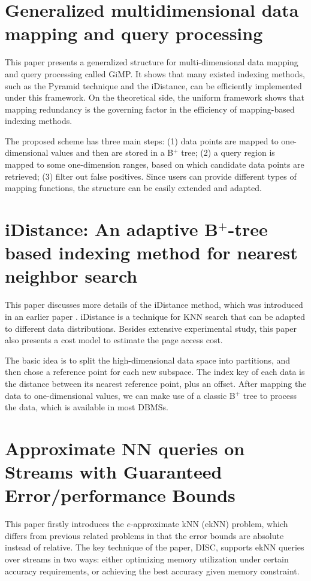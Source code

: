 \documentclass[paper=a4, fontsize=18pt]{article} %
\numberwithin{equation}{section} %
\numberwithin{figure}{section} %
\numberwithin{table}{section} %
\begin{document}
\section{Generalized multidimensional data mapping and query processing \cite{ZKOT05}}

This paper presents a generalized structure for multi-dimensional data mapping and query processing called GiMP. It shows that many existed indexing methods, such as the Pyramid technique and the iDistance, can be efficiently implemented under this framework. On the theoretical side, the uniform framework shows that mapping redundancy is the governing factor in the efficiency of mapping-based indexing methods.

The proposed scheme has three main steps: (1) data points are mapped to one-dimensional values and then are stored in a B\({}^{\mbox{+}}\) tree; (2) a query region is mapped to some one-dimension ranges, based on which candidate data points are retrieved; (3) filter out false positives. Since users can provide different types of mapping functions, the structure can be easily extended and adapted.

\section{iDistance: An adaptive B$^+$-tree based indexing method for nearest neighbor search \cite{JOTYZ05}}

This paper discusses more details of the iDistance method, which was introduced in an earlier paper \cite{OoiYTJ01}. iDistance is a technique for KNN search that can be adapted to different data distributions. Besides extensive experimental study, this paper also presents a cost model to estimate the page access cost.

The basic idea is to split the high-dimensional data space into partitions, and then chose a reference point for each new subspace. The index key of each data is the distance between its nearest reference point, plus an offset. After mapping the data to one-dimensional values, we can make use of a classic B\({}^{\mbox{+}}\) tree to process the data, which is available in most DBMSs.

\section{Approximate NN queries on Streams with Guaranteed Error/performance Bounds \cite{KOT004}}

This paper firstly introduces the $e$-approximate kNN (ekNN) problem, which differs from previous related problems in that the error bounds are absolute instead of relative. The key technique of the paper, DISC, supports ekNN queries over streams in two ways: either optimizing memory utilization under certain accuracy requirements, or achieving the best accuracy given memory constraint.
\end{document}
